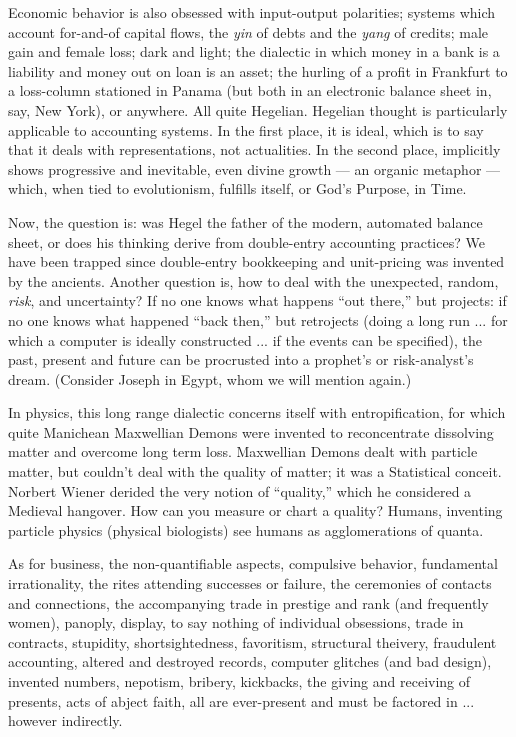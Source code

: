 Economic behavior is also obsessed with
input-output polarities; systems which account for-and-of capital flows, the \emph{yin} of
debts and the \emph{yang} of credits; male gain and
female loss; dark and light; the dialectic in
which money in a bank is a liability and
money out on loan is an asset; the hurling of
a profit in Frankfurt to a loss-column stationed in Panama (but both in an electronic
balance sheet in, say, New York), or anywhere. All quite Hegelian. Hegelian thought
is particularly applicable to accounting systems. In the first place, it is ideal, which is to
say that it deals with representations, not actualities. In the second place, implicitly
shows progressive and inevitable, even divine growth --- an organic metaphor --- which,
when tied to evolutionism, fulfills itself, or God's Purpose, in Time.

Now, the question is: was Hegel the father of the modern, automated balance sheet, or
does his thinking derive from double-entry accounting practices? We have been trapped
since double-entry bookkeeping and unit-pricing was invented by the ancients. Another
question is, how to deal with the unexpected,
random, \emph{risk}, and uncertainty?
If no one knows what happens \enquote{out there,} but projects: if no one knows what happened 
\enquote{back then,} but retrojects (doing a long run ... for
which a computer is ideally constructed ...
if the events can be specified), the past,
present and future can be procrusted into a
prophet's or risk-analyst's dream. (Consider
Joseph in Egypt, whom we will mention again.)

In physics, this long range dialectic concerns itself with entropification, for which
quite Manichean Maxwellian Demons were
invented to reconcentrate dissolving matter and overcome long term loss. Maxwellian Demons
dealt with particle matter, but couldn't deal with the quality of matter; it
was a Statistical conceit. Norbert Wiener
derided the very notion of \enquote{quality,} which
he considered a Medieval hangover. How
can you measure or chart a quality? Humans,
inventing particle physics (physical biologists) see humans as agglomerations of
quanta.

As for business, the non-quantifiable aspects, compulsive behavior, fundamental irrationality, the rites attending successes or
failure, the ceremonies of contacts and connections, the accompanying trade in prestige and rank (and frequently women), panoply, display, to say nothing of individual obsessions, trade in contracts, stupidity, shortsightedness, favoritism, structural theivery,
fraudulent accounting, altered and destroyed
records, computer glitches (and bad design),
invented numbers, nepotism, bribery, kickbacks, the giving and receiving of presents,
acts of abject faith, all are ever-present and
must be factored in ... however indirectly.

